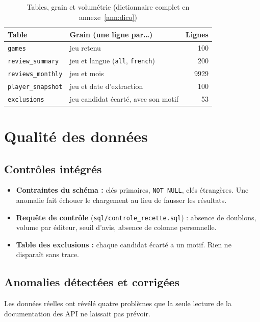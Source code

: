 \documentclass[11pt, a4paper, oneside, headings=normal, numbers=noenddot, DIV=12]{scrartcl}
\begin{document}
\begin{table}[H]
\centering\small
\begin{tabularx}{\linewidth}{@{}l Y r@{}}
\toprule
\textbf{Table} & \textbf{Grain (une ligne par…)} & \textbf{Lignes} \\
\midrule
\texttt{games} & jeu retenu & 100 \\
\texttt{review\_summary} & jeu et langue (\texttt{all}, \texttt{french}) & 200 \\
\texttt{reviews\_monthly} & jeu et mois & \num{9929} \\
\texttt{player\_snapshot} & jeu et date d'extraction & 100 \\
\texttt{exclusions} & jeu candidat écarté, avec son motif & 53 \\
\bottomrule
\end{tabularx}
\caption{Tables, grain et volumétrie (dictionnaire complet en annexe~\ref{ann:dico})}
\end{table}

\section{Qualité des données}

\subsection{Contrôles intégrés}
\begin{itemize}[leftmargin=1.2em]
  \item \textbf{Contraintes du schéma :} clés primaires, \texttt{NOT NULL}, clés étrangères. Une anomalie fait échouer le chargement au lieu de fausser les résultats.
  \item \textbf{Requête de contrôle} (\texttt{sql/controle\_recette.sql}) : absence de doublons, volume par éditeur, seuil d'avis, absence de colonne personnelle.
  \item \textbf{Table des exclusions :} chaque candidat écarté a un motif. Rien ne disparaît sans trace.
\end{itemize}

\subsection{Anomalies détectées et corrigées}
Les données réelles ont révélé quatre problèmes que la seule lecture de la documentation des API ne laissait pas prévoir.
\end{document}
